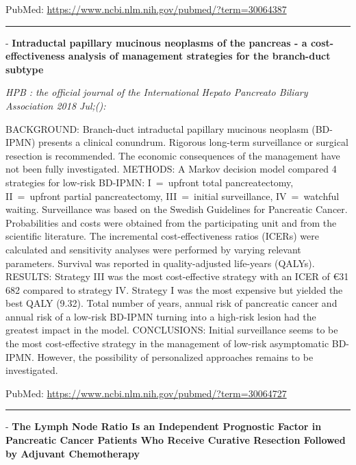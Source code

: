 \documentclass[]{article}
\begin{document}
PubMed: \url{https://www.ncbi.nlm.nih.gov/pubmed/?term=30064387}

{}

{}

\begin{center}\rule{0.5\linewidth}{\linethickness}\end{center}

 - \textbf{Intraductal papillary mucinous neoplasms of the pancreas - a
cost-effectiveness analysis of management strategies for the branch-duct
subtype}

\emph{HPB : the official journal of the International Hepato Pancreato
Biliary Association 2018 Jul;():}

BACKGROUND: Branch-duct intraductal papillary mucinous neoplasm
(BD-IPMN) presents a clinical conundrum. Rigorous long-term surveillance
or surgical resection is recommended. The economic consequences of the
management have not been fully investigated. METHODS: A Markov decision
model compared 4 strategies for low-risk BD-IPMN: I~=~upfront total
pancreatectomy, II~=~upfront partial pancreatectomy, III~=~initial
surveillance, IV~=~watchful waiting. Surveillance was based on the
Swedish Guidelines for Pancreatic Cancer. Probabilities and costs were
obtained from the participating unit and from the scientific literature.
The incremental cost-effectiveness ratios (ICERs) were calculated and
sensitivity analyses were performed by varying relevant parameters.
Survival was reported in quality-adjusted life-years (QALYs). RESULTS:
Strategy III was the most cost-effective strategy with an ICER of €31
682 compared to strategy IV. Strategy I was the most expensive but
yielded the best QALY (9.32). Total number of years, annual risk of
pancreatic cancer and annual risk of a low-risk BD-IPMN turning into a
high-risk lesion had the greatest impact in the model. CONCLUSIONS:
Initial surveillance seems to be the most cost-effective strategy in the
management of low-risk asymptomatic BD-IPMN. However, the possibility of
personalized approaches remains to be investigated.

PubMed: \url{https://www.ncbi.nlm.nih.gov/pubmed/?term=30064727}

{}

{}

\begin{center}\rule{0.5\linewidth}{\linethickness}\end{center}

 - \textbf{The Lymph Node Ratio Is an Independent Prognostic Factor in
Pancreatic Cancer Patients Who Receive Curative Resection Followed by
Adjuvant Chemotherapy}
\end{document}

